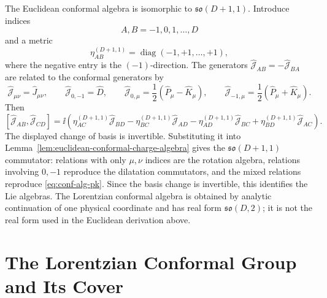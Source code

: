 The Euclidean conformal algebra is isomorphic to \(\mathfrak{so}(D+1,1)\).
Introduce indices
\[
  A,B=-1,0,1,\ldots,D
\]
and a metric
\[
  \eta_{AB}^{(D+1,1)}=\operatorname{diag}(-1,+1,\ldots,+1),
\]
where the negative entry is the \((-1)\)-direction.  The generators
\(\widehat{\mathcal J}_{AB}=-\widehat{\mathcal J}_{BA}\) are
related to the conformal generators by
\[
  \widehat{\mathcal J}_{\mu\nu}=\widehat J_{\mu\nu},\qquad
  \widehat{\mathcal J}_{0,-1}=\widehat D,\qquad
  \widehat{\mathcal J}_{0,\mu}=\frac12(\widehat P_\mu-\widehat K_\mu),
  \qquad
  \widehat{\mathcal J}_{-1,\mu}=\frac12(\widehat P_\mu+\widehat K_\mu).
\]
Then
\[
  [\widehat{\mathcal J}_{AB},\widehat{\mathcal J}_{CD}]
  =
  \ii(
  \eta_{AC}^{(D+1,1)}\widehat{\mathcal J}_{BD}
  -\eta_{BC}^{(D+1,1)}\widehat{\mathcal J}_{AD}
  -\eta_{AD}^{(D+1,1)}\widehat{\mathcal J}_{BC}
  +\eta_{BD}^{(D+1,1)}\widehat{\mathcal J}_{AC}).
\]
The displayed change of basis is invertible.  Substituting it into
Lemma~\ref{lem:euclidean-conformal-charge-algebra} gives the
\(\mathfrak{so}(D+1,1)\) commutator: relations with only \(\mu,\nu\) indices
are the rotation algebra, relations involving \(0,-1\) reproduce the
dilatation commutators, and the mixed relations reproduce
\eqref{eq:conf-alg-pk}.  Since the basis change is invertible, this identifies
the Lie algebras.
The Lorentzian conformal algebra is obtained by analytic continuation of one
physical coordinate and has real form \(\mathfrak{so}(D,2)\); it is not the
real form used in the Euclidean derivation above.

\section{The Lorentzian Conformal Group and Its Cover}
\label{sec:lorentzian-conformal-group-cover}

